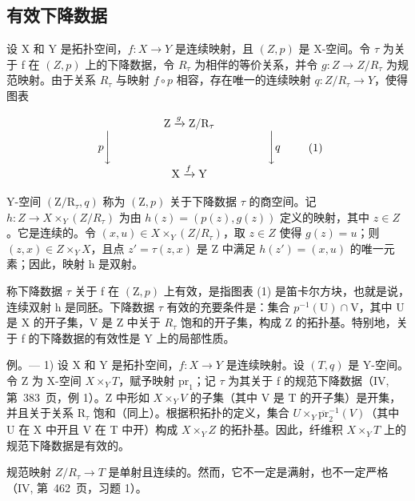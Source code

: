 \subsection{有效下降数据}

设 X 和 Y 是拓扑空间，\(f: X \to Y\) 是连续映射，且 \((Z, p)\) 是 X-空间。令 \(\tau\) 为关于 f 在 \((Z, p)\) 上的下降数据，令 \(R_{\tau}\) 为相伴的等价关系，并令 \(g: Z \to Z/R_{\tau}\) 为规范映射。由于关系 \(R_{\tau}\) 与映射 \(f \circ p\) 相容，存在唯一的连续映射 \(q: Z/R_{\tau} \to Y\)，使得图表

\[
\begin{array}{c} \mathrm{Z} \xrightarrow {g} \mathrm{Z} / \mathrm{R} _ {\tau} \\ p \Biggl \downarrow \qquad \qquad \qquad \qquad \qquad \qquad \qquad \Biggl \downarrow q \\ \mathrm{X} \xrightarrow {f} \mathrm{Y} \end{array}\tag{1}
\]

Y-空间 \((\mathrm{Z}/\mathrm{R}_{\tau}, q)\) 称为 \((\mathrm{Z}, p)\) 关于下降数据 \(\tau\) 的商空间。记 \(h: Z \to X \times_{Y} (Z/R_{\tau})\) 为由 \(h(z) = (p(z), g(z))\) 定义的映射，其中 \(z \in Z\)。它是连续的。令 \((x, u) \in X \times_{Y} (Z/R_{\tau})\)，取 \(z \in Z\) 使得 \(g(z) = u\)；则 \((z, x) \in Z \times_{Y} X\)，且点 \(z' = \tau(z, x)\) 是 Z 中满足 \(h(z') = (x, u)\) 的唯一元素；因此，映射 h 是双射。

称下降数据 \(\tau\) 关于 f 在 \((\mathrm{Z},p)\) 上有效，是指图表 (1) 是笛卡尔方块，也就是说，连续双射 h 是同胚。下降数据 \(\tau\) 有效的充要条件是：集合 \(p^{-1}(\mathrm{U})\cap \mathrm{V}\)，其中 U 是 X 的开子集，V 是 Z 中关于 \(R_{\tau}\) 饱和的开子集，构成 Z 的拓扑基。特别地，关于 f 的下降数据的有效性是 Y 上的局部性质。

例。--- 1) 设 X 和 Y 是拓扑空间，\(f\colon X\to Y\) 是连续映射。设 \((T,q)\) 是 Y-空间。令 Z 为 X-空间 \(X\times_Y T\)，赋予映射 \(\mathrm{pr}_{1}\)；记 \(\tau\) 为其关于 f 的规范下降数据（IV, 第~383~页，例 1）。Z 中形如 \(X\times_Y V\) 的子集（其中 V 是 T 的开子集）是开集，并且关于关系 \(\mathrm{R}_{\tau}\) 饱和（同上）。根据积拓扑的定义，集合 \(U\times_Y\overline{\mathrm{pr}}_{2}^{-1}(V)\)（其中 U 在 X 中开且 V 在 T 中开）构成 \(X\times_Y Z\) 的拓扑基。因此，纤维积 \(X\times_Y T\) 上的规范下降数据是有效的。

规范映射 \(Z/R_{\tau} \rightarrow T\) 是单射且连续的。然而，它不一定是满射，也不一定严格（IV, 第~462~页，习题 1）。

